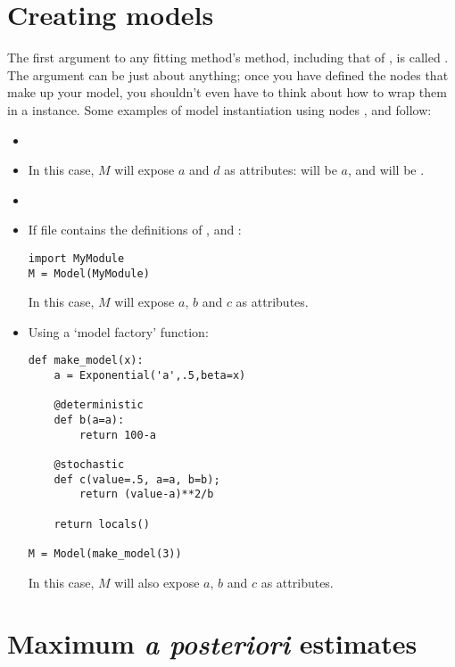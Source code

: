 \section{Creating models} \label{sec:ModelInstantiation}
The first argument to any fitting method's  method, including that of , is called . The  argument can be just about anything; once you have defined the nodes that make up your model, you shouldn't even have to think about how to wrap them in a  instance. Some examples of model instantiation using nodes ,  and  follow:
\begin{itemize}
    \item {}
    \item {} In this case, $M$ will expose $a$ and $d$ as attributes:  will be $a$, and  will be \code{[b,c]}.
    \item {}
    \item If file  contains the definitions of ,  and :
   \begin{verbatim}
import MyModule
M = Model(MyModule)
    \end{verbatim}
    In this case, $M$ will expose $a$, $b$ and $c$ as attributes.
    \item Using a `model factory' function:
    \begin{verbatim}
def make_model(x):
    a = Exponential('a',.5,beta=x)

    @deterministic
    def b(a=a):
        return 100-a

    @stochastic
    def c(value=.5, a=a, b=b);
        return (value-a)**2/b

    return locals()

M = Model(make_model(3))
    \end{verbatim}
    In this case, $M$ will also expose $a$, $b$ and $c$ as attributes.
\end{itemize}


\hypertarget{MAP}{}
\section{Maximum \emph{a posteriori} estimates} \label{sec:MAP}

